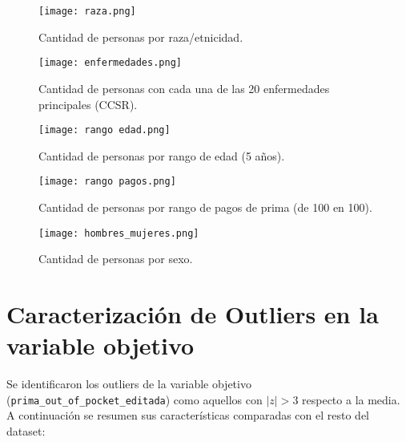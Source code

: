 \documentclass[12pt,a4paper]{article}
\begin{document}
\begin{itemize}
\begin{figure}[H]
    \centering
    \texttt{[image: raza.png]}
    \caption{Cantidad de personas por raza/etnicidad.}
\end{figure}

\begin{figure}[H]
    \centering
    \texttt{[image: enfermedades.png]}
    \caption{Cantidad de personas con cada una de las 20 enfermedades principales (CCSR).}
\end{figure}

\begin{figure}[H]
    \centering
    \texttt{[image: rango edad.png]}
    \caption{Cantidad de personas por rango de edad (5 años).}
\end{figure}

\begin{figure}[H]
    \centering
    \texttt{[image: rango pagos.png]}
    \caption{Cantidad de personas por rango de pagos de prima (de 100 en 100).}
\end{figure}

\begin{figure}[H]
    \centering
    \texttt{[image: hombres\_mujeres.png]}
    \caption{Cantidad de personas por sexo.}
\end{figure}



\section*{Caracterización de Outliers en la variable objetivo}
Se identificaron los outliers de la variable objetivo (\texttt{prima\_out\_of\_pocket\_editada}) como aquellos con $|z| > 3$ respecto a la media. A continuación se resumen sus características comparadas con el resto del dataset:


\end{itemize}
\end{document}
